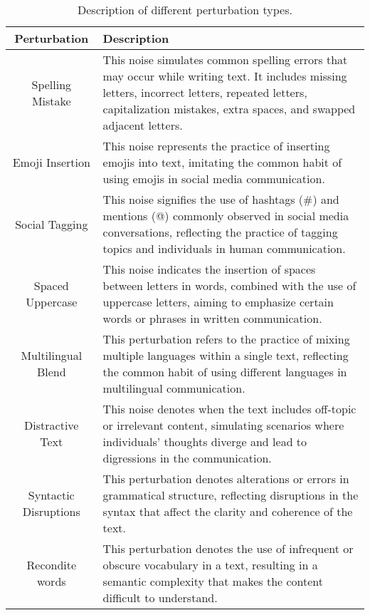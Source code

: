 \begin{table}[t]
    \centering
    \small
    \caption{Description of different perturbation types.}
    \renewcommand\arraystretch{1.3}
    \begin{tabular}{cp{12.5cm}}
    \toprule[1pt]
    \textbf{Perturbation} & \textbf{Description}   \\
    \midrule
        Spelling Mistake & This noise simulates common spelling errors that may occur while writing text. It includes missing letters, incorrect letters, repeated letters, capitalization mistakes, extra spaces, and swapped adjacent letters.
  \\
        Emoji Insertion & This noise represents the practice of inserting emojis into text, imitating the common habit of using emojis in social media communication.  \\
        Social Tagging & This noise signifies the use of hashtags (\#) and mentions (@) commonly observed in social media conversations, reflecting the practice of tagging topics and individuals in human communication. \\
        Spaced Uppercase & This noise indicates the insertion of spaces between letters in words, combined with the use of uppercase letters, aiming to emphasize certain words or phrases in written communication. \\
        Multilingual Blend & This perturbation refers to the practice of mixing multiple languages within a single text, reflecting the common habit of using different languages in multilingual communication.  \\
        Distractive Text & This noise denotes when the text includes off-topic or irrelevant content, simulating scenarios where individuals’ thoughts diverge and lead to digressions in the communication. \\
        Syntactic Disruptions & This perturbation denotes alterations or errors in grammatical structure, reflecting disruptions in the syntax that affect the clarity and coherence of the text. \\
        Recondite words & This perturbation denotes the use of infrequent or obscure vocabulary in a text, resulting in a semantic complexity that makes the content difficult to understand.   \\
    \bottomrule[1pt]
    \end{tabular}
    \label{tab:pertubation_types}
    \vspace{-20pt}
\end{table}





